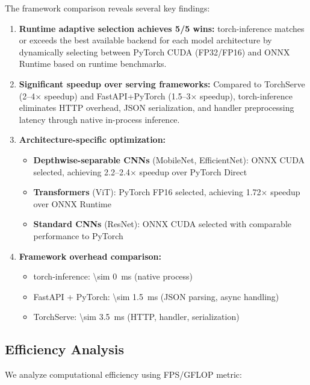 \documentclass[10pt,twocolumn,a4paper]{article}
\theoremstyle{definition}
\theoremstyle{plain}
\newcommand{\timesX}[1]{#1$\times$}
\begin{document}
The framework comparison reveals several key findings:

\begin{enumerate}
    \item \textbf{Runtime adaptive selection achieves 5/5 wins:} torch-inference matches or exceeds the best available backend for each model architecture by dynamically selecting between PyTorch CUDA (FP32/FP16) and ONNX Runtime based on runtime benchmarks.
    
    \item \textbf{Significant speedup over serving frameworks:} Compared to TorchServe (\timesX{2--4} speedup) and FastAPI+PyTorch (\timesX{1.5--3} speedup), torch-inference eliminates HTTP overhead, JSON serialization, and handler preprocessing latency through native in-process inference.
    
    \item \textbf{Architecture-specific optimization:}
    \begin{itemize}
        \item \textbf{Depthwise-separable CNNs} (MobileNet, EfficientNet): ONNX CUDA selected, achieving \timesX{2.2--2.4} speedup over PyTorch Direct
        \item \textbf{Transformers} (ViT): PyTorch FP16 selected, achieving \timesX{1.72} speedup over ONNX Runtime
        \item \textbf{Standard CNNs} (ResNet): ONNX CUDA selected with comparable performance to PyTorch
    \end{itemize}
    
    \item \textbf{Framework overhead comparison:}
    \begin{itemize}
        \item torch-inference: \SI{\sim 0}{\milli\second} (native process)
        \item FastAPI + PyTorch: \SI{\sim 1.5}{\milli\second} (JSON parsing, async handling)
        \item TorchServe: \SI{\sim 3.5}{\milli\second} (HTTP, handler, serialization)
    \end{itemize}
\end{enumerate}

\subsection{Efficiency Analysis}

We analyze computational efficiency using FPS/GFLOP metric:
\end{document}
